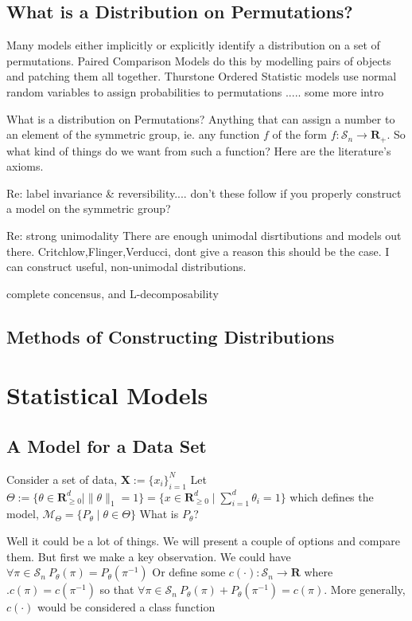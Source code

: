 \documentclass{article}
\theoremstyle{definition}
\begin{document}
\subsection{What is a Distribution on Permutations?}
Many models either implicitly or explicitly identify a distribution on a set of permutations. Paired Comparison Models do this by modelling pairs of objects and patching them all together. Thurstone Ordered Statistic models use normal random variables to assign probabilities to permutations ..... some more intro

What is a distribution on Permutations? Anything that can assign a number to an element of the symmetric group, ie. any function $f$ of the form \(f:\mathcal{S}_n \rightarrow \mathbf{R}_+ \). So what kind of things do we want from such a function? Here are the literature's axioms. 

Re: label invariance & reversibility....
    don't these follow if you properly construct a model on the symmetric group?

Re: strong unimodality
    There are enough unimodal disrtibutions and models out there. Critchlow,Flinger,Verducci, dont give a reason this should be the case. I can construct useful, non-unimodal distributions.
    
complete concensus, and L-decomposability

\subsection{Methods of Constructing Distributions}

\section{Statistical Models}
\subsection{A Model for a Data Set}
Consider a set of data, \( \mathbf{X} := \{ x_i \}_{i=1}^N\)
Let \(
\Theta := \{ \theta \in \mathbf{R}_{\geq 0}^d \mid  \|\theta\|_1 = 1\} = \{x\in \mathbf{R}_{\geq 0}^d \mid \sum_{i=1}^d \theta_i = 1\} 
\) 
which defines the model, \(
\mathcal{M}_\Theta = \{ P_\theta \mid \theta \in \Theta \}
\)
What is $P_\theta$?

Well it could be a lot of things. We will present a couple of options and compare them. But first we make a key observation. 
We could have $ \forall \pi \in \mathcal{S}_n \: P_\theta(\pi) = P_\theta(\pi^{-1}) $
Or define some $c(\cdot):\mathcal{S}_n \rightarrow \mathbf{R} $ where $. c(\pi) = c(\pi^{-1}) $ so that $ \forall \pi \in \mathcal{S}_n \: P_\theta(\pi) + P_\theta(\pi^{-1})  = c( \pi ) $. More generally, $c(\cdot) $ would be considered a class function
\end{document}
